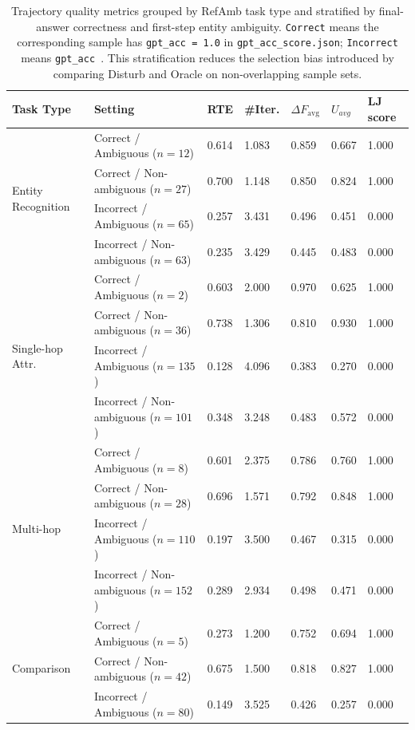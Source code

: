 \begin{table}[htbp]
\centering
\small
\caption{Trajectory quality metrics grouped by RefAmb task type and stratified by final-answer correctness and first-step entity ambiguity. \texttt{Correct} means the corresponding sample has \texttt{gpt\_acc = 1.0} in \texttt{gpt\_acc\_score.json}; \texttt{Incorrect} means \texttt{gpt\_acc }. This stratification reduces the selection bias introduced by comparing Disturb and Oracle on non-overlapping sample sets.}
\begin{tabular}{lllllll}
\hline
\textbf{Task Type} & \textbf{Setting} & \textbf{RTE} & \textbf{\#Iter.} & \textbf{$\Delta F_{\text{avg}}$} & \textbf{$U_{avg}$} & \textbf{LJ score} \\
\hline
\multirow{4}{*}{Entity Recognition} & Correct / Ambiguous ($n=12$) & 0.614 & 1.083 & 0.859 & 0.667 & 1.000 \\
 & Correct / Non-ambiguous ($n=27$) & 0.700 & 1.148 & 0.850 & 0.824 & 1.000 \\
 & Incorrect / Ambiguous ($n=65$) & 0.257 & 3.431 & 0.496 & 0.451 & 0.000 \\
 & Incorrect / Non-ambiguous ($n=63$) & 0.235 & 3.429 & 0.445 & 0.483 & 0.000 \\
\hline
\multirow{4}{*}{Single-hop Attr.} & Correct / Ambiguous ($n=2$) & 0.603 & 2.000 & 0.970 & 0.625 & 1.000 \\
 & Correct / Non-ambiguous ($n=36$) & 0.738 & 1.306 & 0.810 & 0.930 & 1.000 \\
 & Incorrect / Ambiguous ($n=135$) & 0.128 & 4.096 & 0.383 & 0.270 & 0.000 \\
 & Incorrect / Non-ambiguous ($n=101$) & 0.348 & 3.248 & 0.483 & 0.572 & 0.000 \\
\hline
\multirow{4}{*}{Multi-hop} & Correct / Ambiguous ($n=8$) & 0.601 & 2.375 & 0.786 & 0.760 & 1.000 \\
 & Correct / Non-ambiguous ($n=28$) & 0.696 & 1.571 & 0.792 & 0.848 & 1.000 \\
 & Incorrect / Ambiguous ($n=110$) & 0.197 & 3.500 & 0.467 & 0.315 & 0.000 \\
 & Incorrect / Non-ambiguous ($n=152$) & 0.289 & 2.934 & 0.498 & 0.471 & 0.000 \\
\hline
\multirow{4}{*}{Comparison} & Correct / Ambiguous ($n=5$) & 0.273 & 1.200 & 0.752 & 0.694 & 1.000 \\
 & Correct / Non-ambiguous ($n=42$) & 0.675 & 1.500 & 0.818 & 0.827 & 1.000 \\
 & Incorrect / Ambiguous ($n=80$) & 0.149 & 3.525 & 0.426 & 0.257 & 0.000 \\

\end{tabular}
\end{table}
